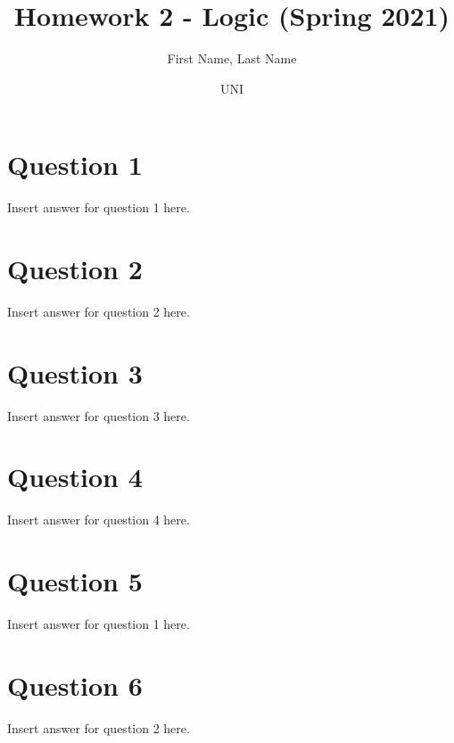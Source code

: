 \documentclass{article}
\title{Homework 2 - Logic (Spring 2021)}
\author
{
First Name, Last Name
\and UNI
}
\begin{document}
    \maketitle
    
    \section*{Question 1}
    Insert answer for question 1 here.
    \newpage
    \section*{Question 2}
    Insert answer for question 2 here.
    \newpage
    \section*{Question 3}
    Insert answer for question 3 here.
    \newpage
    \section*{Question 4}
    Insert answer for question 4 here.
    \newpage
    \section*{Question 5}
    Insert answer for question 1 here.
    \newpage
    \section*{Question 6}
    Insert answer for question 2 here.    
   

   
\end{document}
